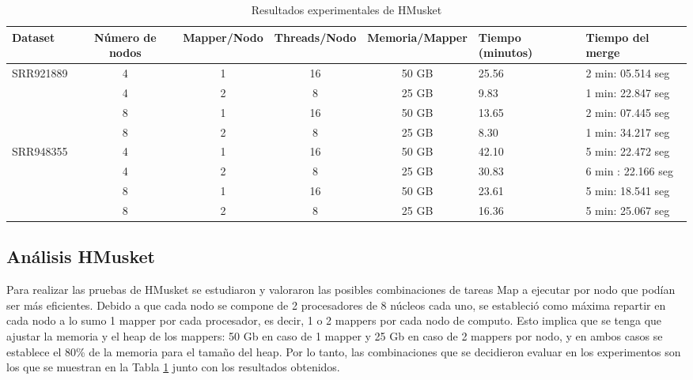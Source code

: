 \documentclass[conference]{IEEEtran}
\begin{document}
\begin{table}[]
	\begin{tabular}{|l|c|c|c|c|l|l|}
		\hline
		\textbf{Dataset} &	\textbf{Número de nodos} & \textbf{Mapper/Nodo} & \textbf{Threads/Nodo} & \textbf{Memoria/Mapper} & \textbf{Tiempo (minutos)} & \textbf{Tiempo del merge}	\\ \hline
		\multirow{ 4}{*}{SRR921889} &	4 & 1 & 16 & 50 GB & 25.56	& 2 min: 05.514 seg	\\ \cline{2-7}
									&	4 & 2 & 8 & 25 GB  & 9.83	& 1 min: 22.847 seg	\\ \cline{2-7}
									&	8 & 1 & 16 & 50 GB & 13.65	& 2 min: 07.445 seg	\\ \cline{2-7}
									&	8 & 2 & 8 & 25 GB  & 8.30	& 1 min: 34.217 seg	\\ \hline \hline
									
		\multirow{ 4}{*}{SRR948355} &	4 & 1 & 16 & 50 GB & 42.10	& 5 min: 22.472 seg	\\ \cline{2-7}
									&	4 & 2 & 8 & 25 GB  & 30.83	& 6 min : 22.166 seg	\\ \cline{2-7}
									&	8 & 1 & 16 & 50 GB & 23.61	& 5 min: 18.541 seg	\\ \cline{2-7}
									&	8 & 2 & 8 & 25 GB  & 16.36	& 5 min: 25.067 seg \\ \hline
	\end{tabular}
	\caption{Resultados experimentales de HMusket}
	\label{hmusket_experiment_result}
\end{table}

\subsection{Análisis HMusket}
Para realizar las pruebas de HMusket se estudiaron y valoraron las posibles combinaciones de tareas Map a ejecutar por nodo que podían ser más eficientes. Debido a que cada nodo se compone de 2 procesadores de 8 núcleos cada uno, se estableció como máxima repartir en cada nodo a lo sumo 1 mapper por cada procesador, es decir, 1 o 2 mappers por cada nodo de computo. Esto implica que se tenga que ajustar la memoria y el heap de los mappers: 50 Gb en caso de 1 mapper y 25 Gb en caso de 2 mappers por nodo, y en ambos casos se establece el 80\% de la memoria para el tamaño del heap. Por lo tanto, las combinaciones que se decidieron evaluar en los experimentos son los que se muestran en la Tabla \ref{hmusket_experiment_result} junto con los resultados obtenidos.\\
\end{document}
